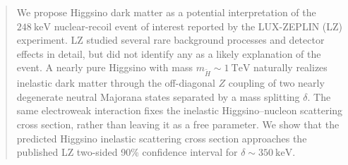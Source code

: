 \documentclass[
aps,
prl,
reprint,
superscriptaddress,
nofootinbib,
nobibnotes
]{revtex4-2}
\begin{document}
\begin{abstract}
We propose Higgsino dark matter as a potential interpretation of the $248~\mathrm{keV}$ nuclear-recoil event of interest reported by the LUX-ZEPLIN (LZ) experiment. LZ studied several rare background processes and detector effects in detail, but did not identify any as a likely explanation of the event. A nearly pure Higgsino with mass $m_{\widetilde H}\sim1~\mathrm{TeV}$ naturally realizes inelastic dark matter through the off-diagonal $Z$ coupling of two nearly degenerate neutral Majorana states separated by a mass splitting $\delta$.
The same electroweak interaction fixes the inelastic Higgsino--nucleon scattering cross section, rather than leaving it as a free parameter.
We show that the predicted Higgsino inelastic scattering cross section approaches the published LZ two-sided 90\% confidence interval for $\delta\sim350~\mathrm{keV}$.

\end{abstract}
\end{document}
